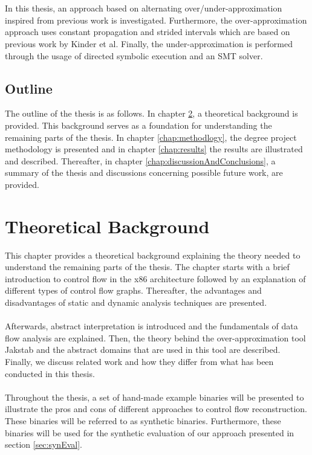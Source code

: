 \documentclass{kththesis}
\newcommand{\fbcomment}[1]{{#1}}
\renewcommand{\fbcomment}[1]{}
\begin{document}
\\ \\
In this thesis, an approach based on alternating over/under-approximation inspired from previous work\cite{alternating} is investigated. Furthermore, the over-approximation approach uses constant propagation and strided intervals which are based on previous work by Kinder et al\cite{Jakstab}. Finally, the under-approximation is performed through the usage of directed symbolic execution and an SMT solver. 

\section{Outline}
\fbcomment{\color{red}Goal: Introduce the outline of the report (Will probably be a bit more specific in the final version of the report)}
The outline of the thesis is as follows. In chapter \ref{chap:background}, a theoretical background is provided. This background serves as a foundation for understanding the remaining parts of the thesis. In chapter \ref{chap:methodlogy}, the degree project methodology is presented and in chapter \ref{chap:results} the results are illustrated and described. Thereafter, in chapter \ref{chap:discussionAndConclusions}, a summary of the thesis and discussions concerning possible future work, are provided.
 
\chapter{Theoretical Background}\label{chap:background}
\fbcomment{\color{red}Goal: Provide enough background information to understand the concepts of the thesis and give the thesis context.}
This chapter provides a theoretical background explaining the theory needed to understand the remaining parts of the thesis. The chapter starts with a brief introduction to control flow in the x86 architecture followed by an explanation of different types of control flow graphs. Thereafter, the advantages and disadvantages of static and dynamic analysis techniques are presented. 
\\ \\
Afterwards, abstract interpretation is introduced and the fundamentals of data flow analysis are explained. Then, the theory behind the over-approximation tool Jakstab and the abstract domains that are used in this tool are described. Finally, we discuss related work and how they differ from what has been conducted in this thesis.
\\ \\
Throughout the thesis, a set of hand-made example binaries will be presented to illustrate the pros and cons of different approaches to control flow reconstruction. These binaries will be referred to as synthetic binaries. Furthermore, these binaries will be used for the synthetic evaluation of our approach presented in section \ref{sec:synEval}.
\end{document}
